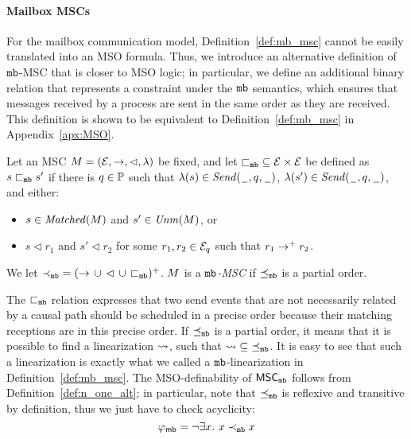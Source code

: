 \paragraph{\bf Mailbox MSCs}
For the mailbox communication model, Definition~\ref{def:mb_msc} cannot be easily translated into an MSO formula. Thus, we introduce an alternative definition of $\mathtt{mb}$-MSC that is closer to MSO logic; in particular, we define an additional binary relation that represents a constraint under the $\mathtt{mb}$ semantics, which ensures that messages received by a process are sent in the same order as they are received. This definition is shown to be equivalent to Definition~\ref{def:mb_msc} in Appendix~\ref{apx:MSO}.

\begin{definition} \label{def:n_one_alt}
	Let an MSC $M = (\mathcal{E},\to,\lhd,\lambda)$ be fixed, and let ${\sqsubset_{\mathtt{mb}}} \subseteq \mathcal{E} \times \mathcal{E}$
	be defined as $s \sqsubset_{\mathtt{mb}} s'$ if there is $q \in \mathbb{P}$
	such that $\lambda(s) \in {\mathit{Send}(\hspace{0.1em}\underline{\hspace{0.5em}}\hspace{0.1em},q,\hspace{0.1em}\underline{\hspace{0.5em}}\hspace{0.1em})}$,
	$\lambda(s') \in {\mathit{Send}(\hspace{0.1em}\underline{\hspace{0.5em}}\hspace{0.1em},q,\hspace{0.1em}\underline{\hspace{0.5em}}\hspace{0.1em})}$, and either:
	\begin{itemize}%
		\item $s \in \mathit{Matched}(M)$ and $s' \in \mathit{Unm}(M)$, or
		\item $s \lhd r_1$ and $s' \lhd r_2$ for some $r_1,r_2 \in \mathcal{E}_q$ such that $r_1 \to^+ r_2$.
	\end{itemize}

	We let ${\prec_{\mathtt{mb}}} = ({\to} \,\cup\, {\lhd} \,\cup\, {\sqsubset_{\mathtt{mb}}})^+$.
	$M $ is a \emph{$\mathtt{mb}$-MSC}
	if ${\preceq_{\mathtt{mb}}}$ is a partial order.
\end{definition}
The ${\sqsubset_{\mathtt{mb}}}$ relation expresses that two send events that are not necessarily related by a causal path should be scheduled in a precise order because their matching receptions are in this precise order. If ${\preceq_{\mathtt{mb}}}$ is a partial order, it means that it is possible to find a linearization $\rightsquigarrow$, such that $\rightsquigarrow \;\subseteq\; \preceq_{\mathtt{mb}}$. It is easy to see that such a linearization is exactly what we called a $\mathtt{mb}$-linearization in Definition~\ref{def:mb_msc}.
The MSO-definability of $\mathsf{MSC}_{\mathtt{mb}}$ follows from Definition~\ref{def:n_one_alt}; in particular, note that 
$\preceq_{\mathtt{mb}}$ is reflexive and transitive by definition, 
thus we just have to check acyclicity:
\[
	\varphi_{\mathsf{mb}} = \neg \exists x.\ x \prec_{\mathtt{mb}} x 
\]

